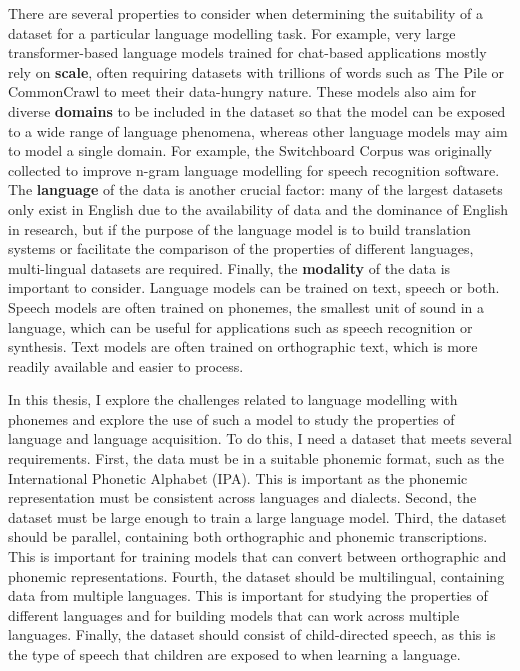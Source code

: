There are several properties to consider when determining the suitability of a dataset for a particular language modelling task. For example, very large transformer-based language models trained for chat-based applications mostly rely on \textbf{scale}, often requiring datasets with trillions of words such as The Pile or CommonCrawl to meet their data-hungry nature. These models also aim for diverse \textbf{domains} to be included in the dataset so that the model can be exposed to a wide range of language phenomena, whereas other language models may aim to model a single domain. For example, the Switchboard Corpus was originally collected to improve n-gram language modelling for speech recognition software. The \textbf{language} of the data is another crucial factor: many of the largest datasets only exist in English due to the availability of data and the dominance of English in research, but if the purpose of the language model is to build translation systems or facilitate the comparison of the properties of different languages, multi-lingual datasets are required. Finally, the \textbf{modality} of the data is important to consider. Language models can be trained on text, speech or both. Speech models are often trained on phonemes, the smallest unit of sound in a language, which can be useful for applications such as speech recognition or synthesis. Text models are often trained on orthographic text, which is more readily available and easier to process.

In this thesis, I explore the challenges related to language modelling with phonemes and explore the use of such a model to study the properties of language and language acquisition. To do this, I need a dataset that meets several requirements. First, the data must be in a suitable phonemic format, such as the International Phonetic Alphabet (IPA). This is important as the phonemic representation must be consistent across languages and dialects. Second, the dataset must be large enough to train a large language model. Third, the dataset should be parallel, containing both orthographic and phonemic transcriptions. This is important for training models that can convert between orthographic and phonemic representations. Fourth, the dataset should be multilingual, containing data from multiple languages. This is important for studying the properties of different languages and for building models that can work across multiple languages. Finally, the dataset should consist of child-directed speech, as this is the type of speech that children are exposed to when learning a language.

